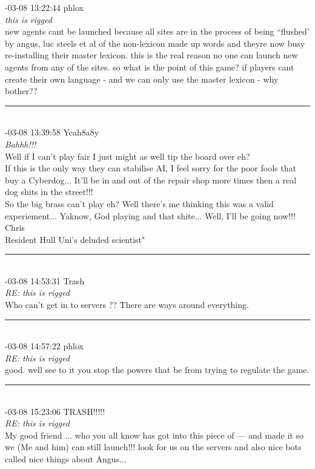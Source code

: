 \begin{mail}
{-03-08 13:22:44 phlox}\\
{\itshape this is rigged}\\
new agents cant be launched because all sites are in the process of being ``flushed' by angus, luc steels et al 
of the non-lexicon made up words and theyre now busy re-installing their master lexicon. this is the real reason 
no one can launch new agents from any of the sites. so what is the point of this game? if players 
cant create their own language - and we can only use the master lexicon - why bother??\\
\rule{0.8\textwidth}{.4pt}\\
{-03-08 13:39:58 Yeah8a8y}\\
{\it	Bahhh!!!}\\
Well if I can't play fair I just might as well tip the board over eh?\\
If this is the only way they can stabilise AI, I feel sorry for the poor fools that buy a Cyberdog... It'll  be in and out of the repair shop more times then a real dog shits in the street!!!\\
So the big brass can't play eh? Well there's me thinking this was a valid experiement... Yaknow, God playing and that shite... Well, I'll be going now!!!\\
Chris\\
Resident Hull Uni's deluded scientist"\\
\rule{0.8\textwidth}{.4pt}\\
{-03-08 14:53:31 Trash}\\
{\itshape RE: this is rigged}\\
Who can't get in to servers ?? 	There are ways around everything.\\
\rule{0.8\textwidth}{.4pt}\\
{-03-08 14:57:22 phlox}\\
{\itshape RE: this is rigged}\\
good. well see to it you stop the powers that be from trying to regulate the game.\\
\rule{0.8\textwidth}{.4pt}\\
{-03-08 15:23:06 TRASH!!!!!}\\
{\itshape RE: this is rigged}\\
My good friend ... who you all know has got into this piece of --- and made it so we (Me and him) can still launch!!! look for us on the servers and also nice bots called nice things about Angus...\\

\end{mail}
